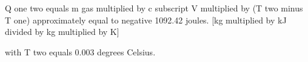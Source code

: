 Q one two equals m gas multiplied by c subscript V multiplied by (T two minus T one) approximately equal to negative 1092.42 joules.  
[kg multiplied by kJ divided by kg multiplied by K]  

with T two equals 0.003 degrees Celsius.
